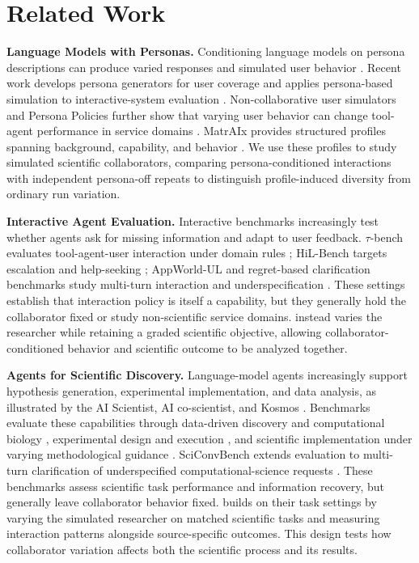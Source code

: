 \section{Related Work}
\label{sec:related-work}

\noindent\textbf{Language Models with Personas.}
Conditioning language models on persona descriptions can produce varied
responses and simulated user behavior
\cite{argyle2022outofone,ge2024personahub}. Recent work develops persona
generators for user coverage and applies persona-based simulation to
interactive-system evaluation
\cite{paglieri2026personagenerators,liu2026personaeval}.
Non-collaborative user simulators and Persona Policies further show that
varying user behavior can change tool-agent performance in service domains
\cite{shim2025noncollaborative,chopra2026ppol}. MatrAIx provides structured
profiles spanning background, capability, and behavior
\cite{li2026matraix}. We use these profiles to study simulated scientific
collaborators, comparing persona-conditioned interactions with independent
persona-off repeats to distinguish profile-induced diversity from ordinary
run variation.

\noindent\textbf{Interactive Agent Evaluation.}
Interactive benchmarks increasingly test whether agents ask for missing
information and adapt to user feedback. $\tau$-bench evaluates tool-agent-user
interaction under domain rules \cite{yao2024taubench}; HiL-Bench targets
escalation and help-seeking \cite{trinh2026hilbench}; AppWorld-UL and
regret-based clarification benchmarks study multi-turn interaction and
underspecification \cite{chen2026appworldul,ta2026regretbench}. These settings
establish that interaction policy is itself a capability, but they generally
hold the collaborator fixed or study non-scientific service domains.
\benchmark instead varies the researcher while retaining a graded scientific
objective, allowing collaborator-conditioned behavior and scientific outcome
to be analyzed together.

\noindent\textbf{Agents for Scientific Discovery.}
Language-model agents increasingly support hypothesis generation,
experimental implementation, and data analysis, as illustrated by the AI
Scientist, AI co-scientist, and Kosmos
\cite{lu2024aiscientist,yamada2025aiscientistv2,gottweis2025coscientist,mitchener2025kosmos}.
Benchmarks evaluate these capabilities through data-driven discovery and
computational biology
\cite{majumder2024discoverybench,mitchener2025bixbench}, experimental
design and execution \cite{kon2025expbench}, and scientific implementation
under varying methodological guidance \cite{zhou2026asibench}.
SciConvBench extends evaluation to multi-turn clarification of
underspecified computational-science requests
\cite{somasekharan2026sciconvbench}. These benchmarks assess scientific
task performance and information recovery, but generally leave collaborator
behavior fixed. \benchmark builds on their task settings by varying the
simulated researcher on matched scientific tasks and measuring interaction
patterns alongside source-specific outcomes. This design tests how
collaborator variation affects both the scientific process and its results.
